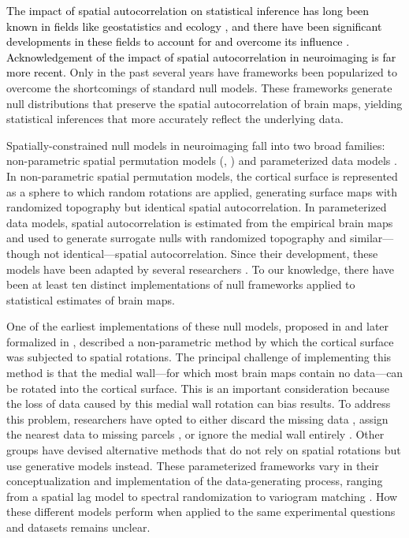 \documentclass[12pt,aps,pra,reprint,showkeys]{revtex4-1}
\newcommand{\nimg}[1]{\textcolor{black}{{#1}}}
\begin{document}
\nimg{The impact of spatial autocorrelation on statistical inference has long been known in fields like geostatistics and ecology \citep{cliff1970ecogeo, legendre1993spatial}, and there have been significant developments in these fields to account for and overcome its influence \citep{cressie2015statistics, dutilleul1993modifying, fortin2000randomization, dray2011geoanalysis, deblauwe2012testing, wagner2015generating}.
Acknowledgement of the impact of spatial autocorrelation in neuroimaging is far more recent.}
Only in the past several years have frameworks been popularized to overcome the shortcomings of standard null models.
These frameworks generate null distributions that preserve the spatial autocorrelation of brain maps, yielding statistical inferences that more accurately reflect the underlying data.

Spatially-constrained null models in neuroimaging fall into two broad families: non-parametric spatial permutation models (\citealt{alexander2013convergence, alexanderbloch2018neuroimage}, \nimg{\citealt{gordon2016cercor}}) and parameterized data models \citep{burt2018natneuro, burt2020neuroimage, vosdewael2020brainspace}.
In non-parametric spatial permutation models, the cortical surface is represented as a sphere to which random rotations are applied, generating surface maps with randomized topography but identical spatial autocorrelation.
In parameterized data models, spatial autocorrelation is estimated from the empirical brain maps and used to generate surrogate nulls with randomized topography and similar---though not identical---spatial autocorrelation.
Since their development, these models have been adapted by several researchers \citep{baum2020pnas, cornblath2020commbio, vasa2018cercor, vazquezrodriguez2019pnas}.
To our knowledge, there have been at least ten distinct implementations of null frameworks applied to statistical estimates of brain maps.

One of the earliest implementations of these null models, proposed in \citet{alexander2013convergence} and later formalized in \citet{alexanderbloch2018neuroimage}, described a non-parametric method by which the cortical surface was subjected to spatial rotations.
The principal challenge of implementing this method is that the medial wall---for which most brain maps contain no data---can be rotated into the cortical surface.
This is an important consideration because the loss of data caused by this medial wall rotation can bias results.
To address this problem, researchers have opted to either discard the missing data \citep{baum2020pnas, cornblath2020commbio}, assign the nearest data to missing parcels \citep{vazquezrodriguez2019pnas}, or ignore the medial wall entirely \citep{vasa2018cercor}.
Other groups have devised alternative methods that do not rely on spatial rotations but use generative models instead.
These parameterized frameworks vary in their conceptualization and implementation of the data-generating process, ranging from a spatial lag model \citep{burt2018natneuro} to spectral randomization \citep{wagner2015generating, vosdewael2020brainspace} to variogram matching \citep{burt2020neuroimage}.
How these different models perform when applied to the same experimental questions and datasets remains unclear.
\end{document}
